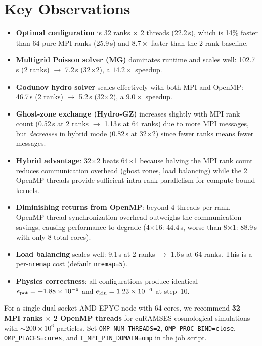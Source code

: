 \documentclass[11pt,fleqn]{book}
\begin{document}
\section{Key Observations}

\begin{itemize}
\item \textbf{Optimal configuration} is 32 ranks $\times$ 2 threads (22.2\,s), which is 14\% faster than 64 pure MPI ranks (25.9\,s) and $8.7\times$ faster than the 2-rank baseline.

\item \textbf{Multigrid Poisson solver (MG)} dominates runtime and scales well: 102.7\,s (2 ranks) $\to$ 7.2\,s (32$\times$2), a $14.2\times$ speedup.

\item \textbf{Godunov hydro solver} scales effectively with both MPI and OpenMP: 46.7\,s (2 ranks) $\to$ 5.2\,s (32$\times$2), a $9.0\times$ speedup.

\item \textbf{Ghost-zone exchange (Hydro-GZ)} increases slightly with MPI rank count (0.52\,s at 2 ranks $\to$ 1.13\,s at 64 ranks) due to more MPI messages, but \emph{decreases} in hybrid mode (0.82\,s at 32$\times$2) since fewer ranks means fewer messages.

\item \textbf{Hybrid advantage}: 32$\times$2 beats 64$\times$1 because halving the MPI rank count reduces communication overhead (ghost zones, load balancing) while the 2 OpenMP threads provide sufficient intra-rank parallelism for compute-bound kernels.

\item \textbf{Diminishing returns from OpenMP}: beyond 4 threads per rank, OpenMP thread synchronization overhead outweighs the communication savings, causing performance to degrade (4$\times$16: 44.4\,s, worse than 8$\times$1: 88.9\,s with only 8 total cores).

\item \textbf{Load balancing} scales well: 9.1\,s at 2 ranks $\to$ 1.6\,s at 64 ranks.  This is a per-\texttt{nremap} cost (default \texttt{nremap=5}).

\item \textbf{Physics correctness}: all configurations produce identical $e_{\rm pot} = -1.88 \times 10^{-6}$ and $e_{\rm kin} = 1.23 \times 10^{-6}$ at step~10.
\end{itemize}

\begin{infobox}
For a single dual-socket AMD EPYC node with 64 cores, we recommend \textbf{32 MPI ranks $\times$ 2 OpenMP threads} for cuRAMSES cosmological simulations with $\sim$$200 \times 10^6$ particles.  Set \texttt{OMP\_NUM\_THREADS=2}, \texttt{OMP\_PROC\_BIND=close}, \texttt{OMP\_PLACES=cores}, and \texttt{I\_MPI\_PIN\_DOMAIN=omp} in the job script.
\end{infobox}
\end{document}
